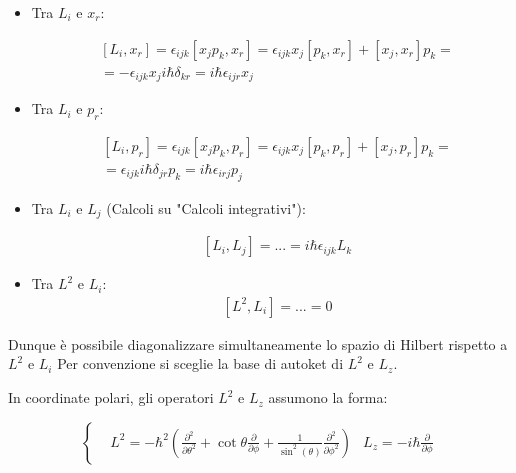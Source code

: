 \documentclass{report}
\begin{document}
\begin{itemize}
  \item Tra $L_i$ e $x_r$:

        \begin{equation}
          \begin{aligned}
             & [L_i, x_r]= \epsilon_{ijk}[x_jp_k, x_r]=\epsilon_{ijk}{x_j[p_k, x_r]+[x_j, x_r]p_k} = \\
             & = -\epsilon_{ijk}{x_ji\hbar\delta_{kr}}=i\hbar\epsilon_{ijr}x_j
          \end{aligned}
        \end{equation}
  \item Tra $L_i$ e $p_r$:

        \begin{equation}
          \begin{aligned}
             & [L_i, p_r]= \epsilon_{ijk}[x_jp_k, p_r]= \epsilon_{ijk}{x_j[p_k, p_r]+[x_j, p_r]p_k}= \\
             & = \epsilon_{ijk}{i\hbar \delta_{jr}p_k}=i\hbar\epsilon_{irj}p_j
          \end{aligned}
        \end{equation}


  \item Tra $L_i$ e $L_j$ (Calcoli su "Calcoli integrativi"):

        \begin{equation}
          \begin{aligned}
             & [L_i,L_j]=...=i\hbar\epsilon_{ijk}L_k
          \end{aligned}
        \end{equation}

  \item Tra $L^2$ e $L_i$:
        \begin{equation}
          \begin{aligned}
             & [L^2,L_i]=...=0
          \end{aligned}
        \end{equation}
\end{itemize}

Dunque è possibile diagonalizzare simultaneamente lo spazio di Hilbert rispetto a $L^2$ e $L_i$
Per convenzione si sceglie la base di autoket di $L^2$ e $L_z$.

In coordinate polari, gli operatori $L^2$ e $L_z$ assumono la forma:

\begin{equation}
  \left\{
  \begin{aligned}
     & L^2=-\hbar^2\left(\frac{\partial^2}{\partial \theta^2}+\cot{\theta}\frac{\partial}{\partial \phi}+\frac{1}{\sin^2(\theta)}\frac{\partial^2}{\partial \phi^2}\right)
     & L_z=-i\hbar\frac{\partial}{\partial \phi}
  \end{aligned}
  \right.
\end{equation}
\end{document}
